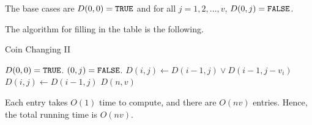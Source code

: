 \documentclass[12pt]{article}
\begin{document}
The base cases are $D(0,0)={\tt TRUE}$ and
for all $j=1,2,\dots,v$,
$D(0,j) = {\tt FALSE}$.

The algorithm for filling in the table is the following.
\begin{algorithm}[h!]
\caption{Coin Changing II}
\begin{algorithmic}
\STATE $D(0,0) = {\tt TRUE}$.
\STATE $(0,j) = {\tt FALSE}$.
\ENDFOR
{}
\STATE $D(i,j) \leftarrow D(i-1,j) \vee D(i-1,j-v_i)$
\ELSE \STATE
$D(i,j)  \leftarrow D(i-1,j)$
\ENDIF
\ENDFOR
\ENDFOR
\RETURN $D(n,v)$
\end{algorithmic}
\end{algorithm}

Each entry takes $O(1)$ time to compute, and there are
$O(nv)$ entries.  Hence, the total running time is $O(nv)$.
\end{document}
